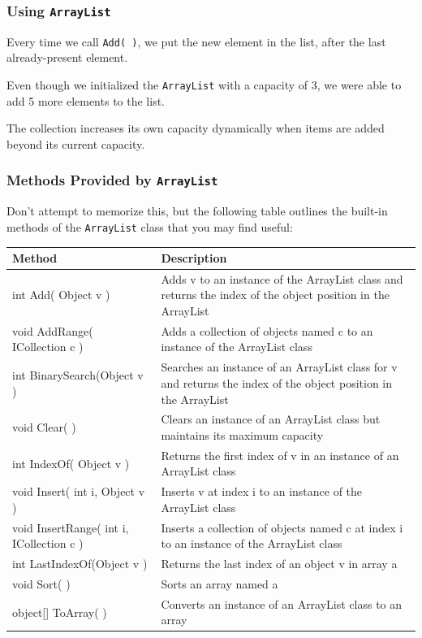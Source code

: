 \begin{frame}
\frametitle{Using \texttt{ArrayList}}

Every time we call \texttt{Add( )}, we put the new element in the list, after the last already-present element.

Even though we initialized the \texttt{ArrayList} with a capacity of 3, we were able to add 5 more elements to the list.

The collection increases its own capacity dynamically when items are added beyond its current capacity.

\end{frame}

\begin{frame}
\frametitle{Methods Provided by \texttt{ArrayList}}
Don't attempt to memorize this, but the following table outlines the built-in methods of the \texttt{ArrayList} class that you may find useful:

{\scriptsize
\begin{center}
\begin{tabular}{p{4.4cm}|p{6.25cm}}
	\textbf{Method} & \textbf{Description} \\ \hline
	int Add( Object v ) & Adds v to an instance of the ArrayList class and returns the index of the object position in the ArrayList\\ \hline
void AddRange( ICollection c ) & Adds a collection of objects named c to an instance of the ArrayList class\\ \hline
int BinarySearch(Object v )& Searches an instance of an ArrayList class for v and returns the index of the object position in the ArrayList\\ \hline
void Clear( ) & Clears an instance of an ArrayList class but maintains its maximum capacity\\ \hline
int IndexOf( Object v ) & Returns the first index of v in an instance of an ArrayList class\\ \hline
void Insert( int i, Object v ) & Inserts v at index i to an instance of the ArrayList class\\ \hline
void InsertRange( int i, {ICollection} c ) & Inserts a collection of objects named c at index i to an instance of the ArrayList class\\ \hline
int LastIndexOf(Object v ) & Returns the last index of an object v in array a\\ \hline
void Sort( ) & Sorts an array named a\\ \hline
object[] ToArray( ) & Converts an instance of an ArrayList class to an array
\end{tabular}
\end{center}
}

\end{frame}

